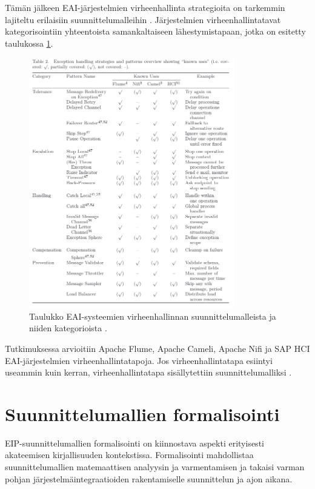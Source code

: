 Tämän jälkeen EAI-järjestelmien virheenhallinta strategioita on tarkemmin lajiteltu erilaisiin suunnittelumalleihin \citep{ExceptionRitter2016}. Järjestelmien virheenhallintatavat kategorisointiin yhteentoista samankaltaiseen lähestymistapaan, jotka on esitetty taulukossa \ref{fig:exceptionritter}.


\begin{figure}[h]
\begin{center}
\includegraphics[width=0.8\textwidth]{kuvat/ritter_expetions.png}
\caption{Taulukko EAI-systeemien virheenhallinnan suunnittelumalleista ja niiden kategorioista \citep{ExceptionRitter2016}.\label{fig:exceptionritter}}
\end{center}
\end{figure}


Tutkimuksessa arvioitiin Apache Flume, Apache Cameli, Apache Nifi ja SAP HCI EAI-järjestelmien virheenhallintatapoja. Jos virheenhallintatapa esiintyi useammin kuin kerran, virheenhallintatapa sisällytettiin suunnittelumalliksi \citep{ExceptionRitter2016}.



\section{Suunnittelumallien formalisointi}
EIP-suunnittelumallien formalisointi on kiinnostava aspekti erityisesti akateemisen kirjallisuuden kontekstissa. Formalisointi mahdollistaa suunnittelumallien matemaattisen analyysin ja varmentamisen ja takaisi varman pohjan järjestelmäintegraatioiden rakentamiselle suunnittelun ja ajon aikana.

